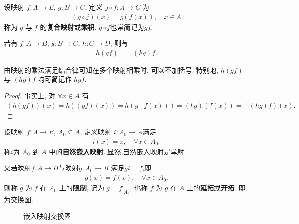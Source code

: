 \documentclass[../../main.tex]{subfiles}%
\begin{document}
\begin{definition}[映射的乘积]
设映射 $f : A \to B$, $g : B \to C$, 定义 $g \circ f : A \to C$ 为
\begin{align*}
(g \circ f)(x) = g(f(x)), \quad x \in A
\end{align*}
称为 $g$ 与 $f$ 的\textbf{复合映射}或\textbf{乘积}. $g \circ f$也常简记为$gf.$
\end{definition}

\begin{theorem}[映射的乘法满足结合律]
若有 \( f: A \to B \), \( g: B \to C \), \( h: C \to D \), 则有
\begin{align*}
h(gf) &= (hg)f. 
\end{align*}
\end{theorem}
\begin{note}
由映射的乘法满足结合律可知在多个映射相乘时, 可以不加括号. 特别地, \( h(gf) \) 与 \( (hg)f \) 均可简记作 \( hgf \).
\end{note}
\begin{proof}
事实上, 对 \( \forall x \in A \) 有
\begin{align*}
(h(gf))(x) = h((gf)(x)) = h(g(f(x))) = (hg)(f(x)) = ((hg)f)(x).
\end{align*}
\end{proof}

\begin{definition}
设映射 $f : A \to B$, $A_0 \subseteq A$, 定义映射 \( i:A_0 \to A \)满足
\begin{align*}
i(x)=x ,\quad \forall x \in A_0.
\end{align*}
称$i$为 \( A_0 \) 到 \( A \) 中的\textbf{自然嵌入映射}. 显然,自然嵌入映射是单射.

又若映射$f : A \to B$与映射$g : A_0 \to B$ 满足$gi=f$,即
\begin{align*}
g(x) = f(x), \quad \forall  x \in A_0.
\end{align*}
则称 $g$ 为 $f$ 在 $A_0$ 上的\textbf{限制}, 记为 $g = f|_{A_0}$, 也称 $f$ 为 $g$ 在 $A$ 上的\textbf{延拓}或\textbf{开拓}. 即为交换图.
\end{definition}
\begin{note}
\begin{figure}[H]
\centering
\caption{嵌入映射交换图}
\label{figure:嵌入映射交换图}
\end{figure}
\end{note}
\end{document}
